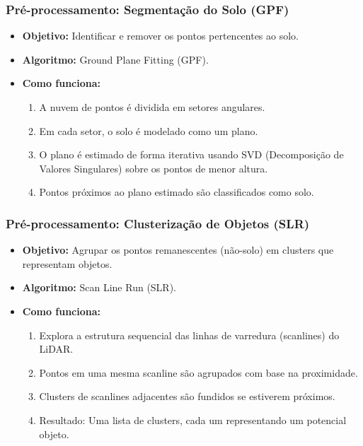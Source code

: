 \documentclass[aspectratio=169,t,xcolor=table]{beamer}
\begin{document}
\begin{frame}
    \frametitle{Pré-processamento: Segmentação do Solo (GPF)}
    \begin{itemize}
        \item \textbf{Objetivo:} Identificar e remover os pontos pertencentes ao solo.
        \item \textbf{Algoritmo:} Ground Plane Fitting (GPF).
        \item \textbf{Como funciona:}
        \begin{enumerate}
            \item A nuvem de pontos é dividida em setores angulares.
            \item Em cada setor, o solo é modelado como um plano.
            \item O plano é estimado de forma iterativa usando SVD (Decomposição de Valores Singulares) sobre os pontos de menor altura.
            \item Pontos próximos ao plano estimado são classificados como solo.
        \end{enumerate}
    \end{itemize}
\end{frame}

\begin{frame}
    \frametitle{Pré-processamento: Clusterização de Objetos (SLR)}
    \begin{itemize}
        \item \textbf{Objetivo:} Agrupar os pontos remanescentes (não-solo) em clusters que representam objetos.
        \item \textbf{Algoritmo:} Scan Line Run (SLR).
        \item \textbf{Como funciona:}
        \begin{enumerate}
            \item Explora a estrutura sequencial das linhas de varredura (scanlines) do LiDAR.
            \item Pontos em uma mesma scanline são agrupados com base na proximidade.
            \item Clusters de scanlines adjacentes são fundidos se estiverem próximos.
            \item Resultado: Uma lista de clusters, cada um representando um potencial objeto.
        \end{enumerate}
    \end{itemize}
\end{frame}

\end{document}
